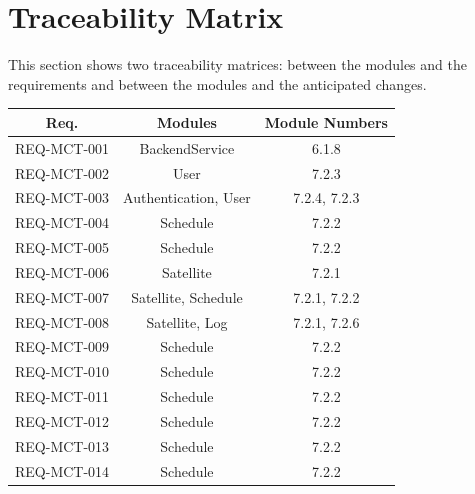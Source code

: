 \documentclass[12pt, titlepage]{article}
\begin{document}
\section{Traceability Matrix} \label{SecTM}

This section shows two traceability matrices: between the modules and the
requirements and between the modules and the anticipated changes.


 
\begin{table}[H]
\centering
\begin{tabular}{|c|c|c|} \hline 
\toprule
\textbf{Req.} & \textbf{Modules} & \textbf{Module Numbers}\\
\midrule

REQ-MCT-001 & BackendService & 6.1.8  \\ 

REQ-MCT-002 & User & 7.2.3 \\ 

REQ-MCT-003 & Authentication, User & 7.2.4, 7.2.3 \\ 

REQ-MCT-004 & Schedule & 7.2.2 \\ 

REQ-MCT-005 & Schedule & 7.2.2 \\ 

REQ-MCT-006 & Satellite & 7.2.1 \\ 

REQ-MCT-007 & Satellite, Schedule & 7.2.1, 7.2.2 \\ 

REQ-MCT-008 & Satellite, Log & 7.2.1, 7.2.6 \\ 

REQ-MCT-009 & Schedule & 7.2.2 \\ 

REQ-MCT-010 & Schedule & 7.2.2 \\ 

REQ-MCT-011 & Schedule & 7.2.2 \\ 

REQ-MCT-012 & Schedule & 7.2.2 \\ 

REQ-MCT-013 & Schedule & 7.2.2 \\ 

REQ-MCT-014 & Schedule & 7.2.2 \\ 


\end{tabular}
\end{table}
\end{document}
